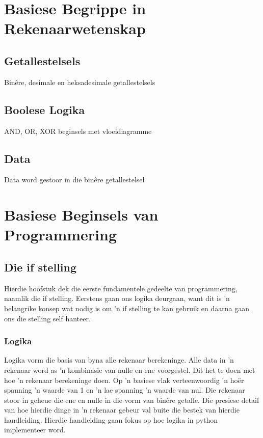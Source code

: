\part[Rekenaarwetenskap Beginsels]
{Basiese Begrippe in\\ Rekenaarwetenskap}

\chapter[Getallestelsels]
{Getallestelsels}

Bin\^ere, desimale en heksadesimale getallestelsels




\chapter[Boolese Logika]
{Boolese Logika}

AND, OR, XOR beginsels met vloeidiagramme

\chapter[Data]
{Data}

Data word gestoor in die bin\^ere getallestelsel
\part[Basiese Beginsels]
{Basiese Beginsels van\\ Programmering}

\chapter[Die if stelling]
{Die if stelling}

Hierdie hoofstuk dek die eerste fundamentele gedeelte van programmering, naamlik die if stelling.  Eerstens gaan ons logika deurgaan, want dit is 'n belangrike konsep wat nodig is om 'n if stelling te kan gebruik en daarna gaan ons die stelling self hanteer.

\section{Logika}

Logika vorm die basis van byna alle rekenaar berekeninge.  Alle data in 'n rekenaar word as 'n kombinasie van nulle en ene voorgestel.  Dit het te doen met hoe 'n rekenaar berekeninge doen.  Op 'n basiese vlak verteenwoordig 'n ho\"er spanning 'n waarde van 1 en 'n lae spanning 'n waarde van nul.  Die rekenaar stoor in geheue die ene en nulle in die vorm van bin\^ere getalle.  Die presiese detail van hoe hierdie dinge in 'n rekenaar gebeur val buite die bestek van hierdie handleiding.  Hierdie handleiding gaan fokus op hoe logika in python implementeer word.

